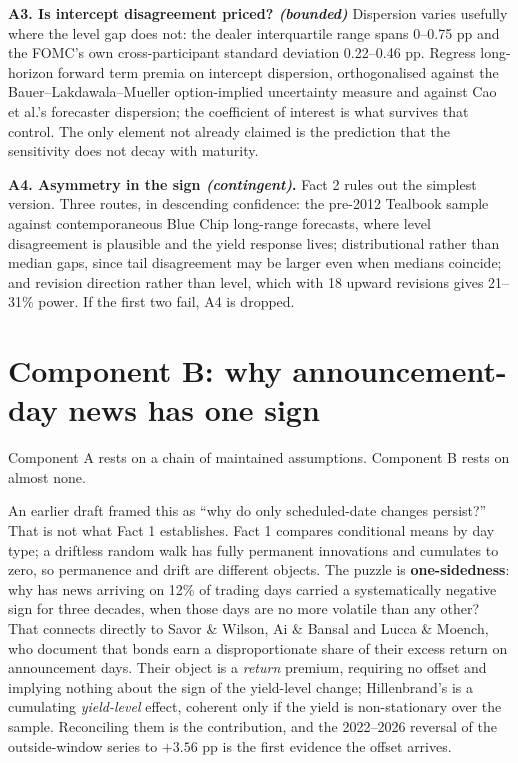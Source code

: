 \documentclass[11pt]{article}
\begin{document}
\textbf{A3. Is intercept disagreement priced? \emph{(bounded)}} Dispersion varies usefully where
the level gap does not: the dealer interquartile range spans 0--0.75 pp and the FOMC's own
cross-participant standard deviation 0.22--0.46 pp. Regress long-horizon forward term premia on
intercept dispersion, orthogonalised against the Bauer--Lakdawala--Mueller option-implied
uncertainty measure and against Cao et al.'s forecaster dispersion; the coefficient of interest
is what survives that control. The only element not already claimed is the prediction that the
sensitivity does not decay with maturity.

\textbf{A4. Asymmetry in the sign \emph{(contingent)}.} Fact 2 rules out the simplest version.
Three routes, in descending confidence: the pre-2012 Tealbook sample against contemporaneous Blue
Chip long-range forecasts, where level disagreement is plausible and the yield response lives;
distributional rather than median gaps, since tail disagreement may be larger even when medians
coincide; and revision direction rather than level, which with 18 upward revisions gives 21--31\%
power. If the first two fail, A4 is dropped.

\section{Component B: why announcement-day news has one sign}

Component A rests on a chain of maintained assumptions. Component B rests on almost none.

An earlier draft framed this as ``why do only scheduled-date changes persist?'' That is not what
Fact 1 establishes. Fact 1 compares conditional means by day type; a driftless random walk has
fully permanent innovations and cumulates to zero, so permanence and drift are different objects.
The puzzle is \textbf{one-sidedness}: why has news arriving on 12\% of trading days carried a
systematically negative sign for three decades, when those days are no more volatile than any
other? That connects directly to Savor \& Wilson, Ai \& Bansal and Lucca \& Moench, who document
that bonds earn a disproportionate share of their excess return on announcement days. Their
object is a \emph{return} premium, requiring no offset and implying nothing about the sign of the
yield-level change; Hillenbrand's is a cumulating \emph{yield-level} effect, coherent only if the
yield is non-stationary over the sample. Reconciling them is the contribution, and the 2022--2026
reversal of the outside-window series to $+3.56$ pp is the first evidence the offset arrives.
\end{document}
